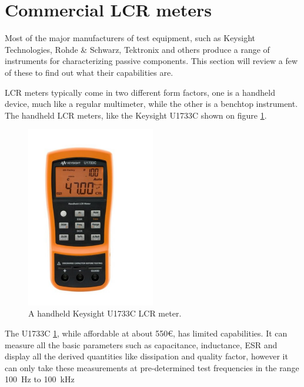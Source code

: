 \section{Commercial LCR meters} \label{sec:CommercialLCRMeters}
Most of the major manufacturers of test equipment, such as Keysight Technologies, Rohde \& Schwarz, Tektronix and others produce a range of instruments for characterizing passive components. This section will review a few of these to find out what their capabilities are. 

LCR meters typically come in two different form factors, one is a handheld device, much like a regular multimeter, while the other is a benchtop instrument. The handheld LCR meters, like the Keysight U1733C\cite{KeysightU1733C} shown on figure \ref{fig:2_2_U1733C}.
\begin{figure}[H]
    \centering
    \includegraphics[clip, trim=0 50 0 50, width=0.5\textwidth]{Sections/2_ProblemAnalysis/FIgures/KeysightU1733C.pdf}
    \caption{A handheld Keysight U1733C LCR meter.}
    \label{fig:2_2_U1733C}
\end{figure}
The U1733C \ref{fig:2_2_U1733C}, while affordable at about 550€, has limited capabilities. It can measure all the basic parameters such as capacitance, inductance, ESR and display all the derived quantities like dissipation and quality factor, however it can only take these measurements at pre-determined test frequencies in the range \SI[]{100}{\hertz} to \SI[]{100}{\kilo\hertz} 









